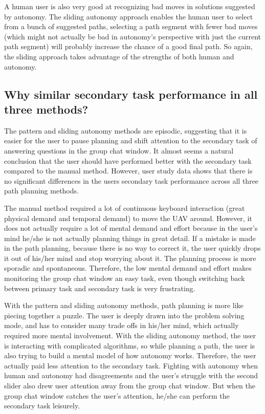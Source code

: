 \documentclass[journal]{IEEEtran}
\begin{document}
A human user is also very good at recognizing bad moves in solutions suggested by autonomy. The sliding autonomy approach enables the human user to select from a bunch of suggested paths, selecting a path segment with fewer bad moves (which might not actually be bad in autonomy's perspective with just the current path segment) will probably increase the chance of a good final path. So again, the sliding approach takes advantage of the strengths of both human and autonomy.

\subsection{Why similar secondary task performance in all three methods?}

The pattern and sliding autonomy methods are episodic, suggesting that it is easier for the user to pause planning and shift attention to the secondary task of answering questions in the group chat window. It almost seems a natural conclusion that the user should have performed better with the secondary task compared to the manual method. However, user study data shows that there is no significant differences in the users secondary task performance across all three path planning methods.

The manual method required a lot of continuous keyboard interaction (great physical demand and temporal demand) to move the UAV around. However, it does not actually require a lot of mental demand and effort because in the user's mind he/she is not actually planning things in great detail. If a mistake is made in the path planning, because there is no way to correct it, the user quickly drops it out of his/her mind and stop worrying about it. The planning process is more sporadic and spontaneous. Therefore, the low mental demand and effort makes monitoring the group chat window an easy task, even though switching back between primary task and secondary task is very frustrating.

With the pattern and sliding autonomy methods, path planning is more like piecing together a puzzle. The user is deeply drawn into the problem solving mode, and has to consider many trade offs in his/her mind, which actually required more mental involvement. With the sliding autonomy method, the user is interacting with complicated algorithms, so while planning a path, the user is also trying to build a mental model of how autonomy works. Therefore, the user actually paid less attention to the secondary task. Fighting with autonomy when human and autonomy had disagreements and the user's struggle with the second slider also drew user attention away from the group chat window. But when the group chat window catches the user's attention, he/she can perform the secondary task leisurely.
\end{document}
